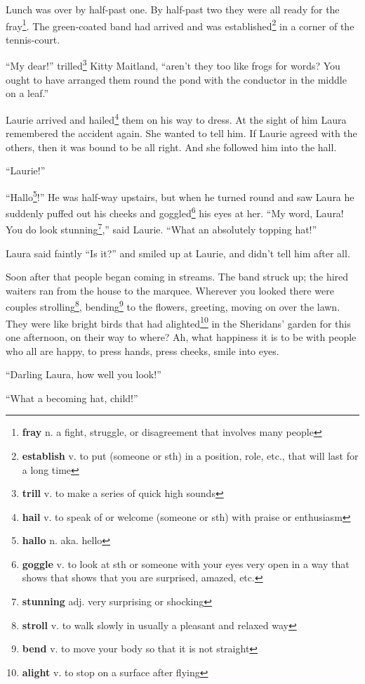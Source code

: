 Lunch was over by half-past one. By half-past two they were all ready for the fray\footnote{\textbf{fray} n. a fight, struggle, or disagreement that involves many people}. The green-coated band had arrived and was established\footnote{\textbf{establish} v. to put (someone or sth) in a position, role, etc., that will last for a long time} in a corner of the tennis-court.

``My dear!'' trilled\footnote{\textbf{trill} v. to make a series of quick high sounds} Kitty Maitland, ``aren't they too like frogs for words? You ought to have arranged them round the pond with the conductor in the middle on a leaf.''

Laurie arrived and hailed\footnote{\textbf{hail} v. to speak of or welcome (someone or sth) with praise or enthusiasm} them on his way to dress. At the sight of him Laura remembered the accident again. She wanted to tell him. If Laurie agreed with the others, then it was bound to be all right. And she followed him into the hall.

``Laurie!''

``Hallo\footnote{\textbf{hallo} n. aka. hello}!'' He was half-way upstairs, but when he turned round and saw Laura he suddenly puffed out his cheeks and goggled\footnote{\textbf{goggle} v. to look at sth or someone with your eyes very open in a way that shows that shows that you are surprised, amazed, etc.} his eyes at her. ``My word, Laura! You do look stunning\footnote{\textbf{stunning} adj. very surprising or shocking},'' said Laurie. ``What an absolutely topping hat!''

Laura said faintly ``Is it?'' and smiled up at Laurie, and didn't tell him after all.

Soon after that people began coming in streams. The band struck up; the hired waiters ran from the house to the marquee. Wherever you looked there were couples strolling\footnote{\textbf{stroll} v. to walk slowly in usually a pleasant and relaxed way}, bending\footnote{\textbf{bend} v. to move your body so that it is not straight} to the flowers, greeting, moving on over the lawn. They were like bright birds that had alighted\footnote{\textbf{alight} v. to stop on a surface after flying} in the Sheridans' garden for this one afternoon, on their way to where? Ah, what happiness it is to be with people who all are happy, to press hands, press cheeks, smile into eyes.

``Darling Laura, how well you look!''

``What a becoming hat, child!''

